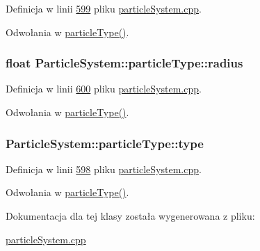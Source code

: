 Definicja w linii \hyperlink{particle_system_8cpp_source_l00599}{599} pliku \hyperlink{particle_system_8cpp_source}{particle\-System.\-cpp}.



Odwołania w \hyperlink{particle_system_8cpp_source_l00601}{particle\-Type()}.

\hypertarget{class_particle_system_1_1particle_type_a262c51b90d7c71f897584e1584c22a41}{
\subsubsection[{radius}]{\setlength{\rightskip}{0pt plus 5cm}float Particle\-System\-::particle\-Type\-::radius}}\label{class_particle_system_1_1particle_type_a262c51b90d7c71f897584e1584c22a41}


Definicja w linii \hyperlink{particle_system_8cpp_source_l00600}{600} pliku \hyperlink{particle_system_8cpp_source}{particle\-System.\-cpp}.



Odwołania w \hyperlink{particle_system_8cpp_source_l00601}{particle\-Type()}.

\hypertarget{class_particle_system_1_1particle_type_aa28b152ee001a7797b9a308291a8c92a}{
\subsubsection[{type}]{ Particle\-System\-::particle\-Type\-::type}}\label{class_particle_system_1_1particle_type_aa28b152ee001a7797b9a308291a8c92a}


Definicja w linii \hyperlink{particle_system_8cpp_source_l00598}{598} pliku \hyperlink{particle_system_8cpp_source}{particle\-System.\-cpp}.



Odwołania w \hyperlink{particle_system_8cpp_source_l00601}{particle\-Type()}.



Dokumentacja dla tej klasy została wygenerowana z pliku\-:\begin{DoxyCompactItemize}
\item 
\hyperlink{particle_system_8cpp}{particle\-System.\-cpp}\end{DoxyCompactItemize}
